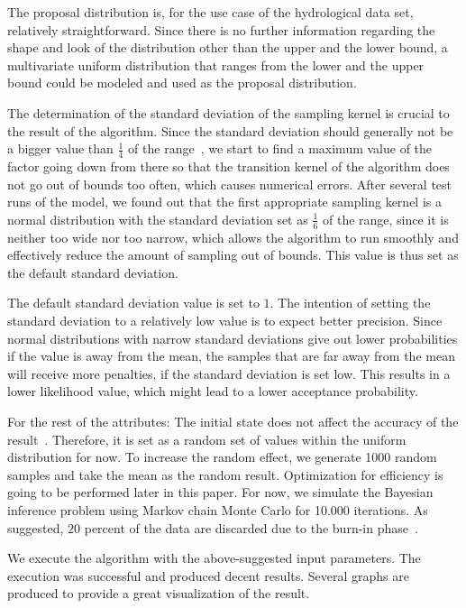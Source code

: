 The proposal distribution is, for the use case of the hydrological data set, relatively straightforward. Since there is no further information regarding the shape and look of the distribution other than the upper and the lower bound, a multivariate uniform distribution that ranges from the lower and the upper bound could be modeled and used as the proposal distribution.

The determination of the standard deviation of the sampling kernel is crucial to the result of the algorithm. Since the standard deviation should generally not be a bigger value than $\frac 1 4$ of the range~\cite{good_standard_deviation}, we start to find a maximum value of the factor going down from there so that the transition kernel of the algorithm does not go out of bounds too often, which causes numerical errors. After several test runs of the model, we found out that the first appropriate sampling kernel is a normal distribution with the standard deviation set as $\frac 1 6$ of the range, since it is neither too wide nor too narrow, which allows the algorithm to run smoothly and effectively reduce the amount of sampling out of bounds. This value is thus set as the default standard deviation.

The default standard deviation value is set to $1$. The intention of setting the standard deviation to a relatively low value is to expect better precision. Since normal distributions with narrow standard deviations give out lower probabilities if the value is away from the mean, the samples that are far away from the mean will receive more penalties, if the standard deviation is set low. This results in a lower likelihood value, which might lead to a lower acceptance probability.

For the rest of the attributes: The initial state does not affect the accuracy of the result~\cite{mcmc_practice}. Therefore, it is set as a random set of values within the uniform distribution for now. To increase the random effect, we generate 1000 random samples and take the mean as the random result. Optimization for efficiency is going to be performed later in this paper. For now, we simulate the Bayesian inference problem using Markov chain Monte Carlo for 10.000 iterations. As suggested, $20$ percent of the data are discarded due to the burn-in phase~\cite{20per_burnin}.


We execute the algorithm with the above-suggested input parameters. The execution was successful and produced decent results. Several graphs are produced to provide a great visualization of the result. 


